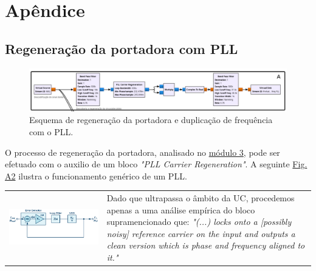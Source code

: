 \renewcommand{\thefigure}{A\arabic{figure}}
\renewcommand{\thetable}{A\arabic{table}}
\setcounter{figure}{0}
\section{Apêndice}
\subsection{Regeneração da portadora com PLL}
\label{subsec:PLL}

\begin{figure}[H]
    \centering
    \includegraphics[width = 0.9\linewidth]{img/appendix/PLL_galore.png}
    \caption{Esquema de regeneração da portadora e duplicação de frequência com o PLL.}
    \label{fig:appendix0}
\end{figure}

O processo de regeneração da portadora, analisado no \hyperref[subsec:mod3]{módulo 3}, pode ser efetuado com o auxilio de um bloco \textit{"PLL Carrier Regeneration"}. A seguinte \hyperref[fig:appendix1]{Fig. A2} ilustra o funcionamento genérico de um PLL. 
\vspace{0.5em}

\begin{tabular}{C{8cm}  L{6.5 cm}}
        \includegraphics[width=\linewidth]{img/appendix/PLL.png} & 
        Dado que ultrapassa o âmbito da UC, procedemos apenas a uma análise empírica do bloco supramencionado que: \textit{"(...) locks onto a [possibly noisy] reference carrier on the input and outputs a clean version which is phase and frequency aligned to it."}\cite{pll_ref_out-gnuradio}
    \end{tabular}
    
